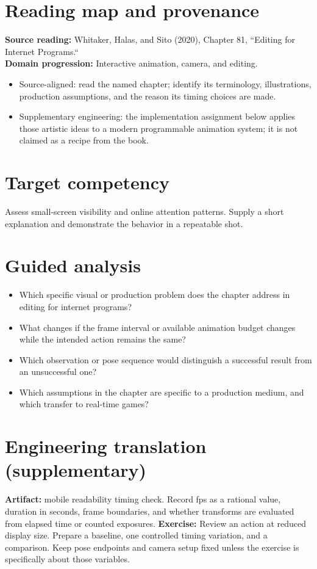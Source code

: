 \documentclass[10pt,letterpaper]{article}
\begin{document}
\makedoctitle
\makedocsummary

\section{Reading map and provenance}
\textbf{Source reading:} Whitaker, Halas, and Sito (2020), Chapter 81, ``Editing for Internet Programs.``\\
\textbf{Domain progression:} Interactive animation, camera, and editing.
\begin{itemize}
\item Source-aligned: read the named chapter; identify its terminology, illustrations, production assumptions, and the reason its timing choices are made.
\item Supplementary engineering: the implementation assignment below applies those artistic ideas to a modern programmable animation system; it is not claimed as a recipe from the book.
\end{itemize}
\section{Target competency}
Assess small-screen visibility and online attention patterns. Supply a short explanation and demonstrate the behavior in a repeatable shot.
\section{Guided analysis}
\begin{itemize}
\item Which specific visual or production problem does the chapter address in editing for internet programs?
\item What changes if the frame interval or available animation budget changes while the intended action remains the same?
\item Which observation or pose sequence would distinguish a successful result from an unsuccessful one?
\item Which assumptions in the chapter are specific to a production medium, and which transfer to real-time games?
\end{itemize}
\section{Engineering translation (supplementary)}
\textbf{Artifact:} mobile readability timing check. Record fps as a rational value, duration in seconds, frame boundaries, and whether transforms are evaluated from elapsed time or counted exposures.
\textbf{Exercise:} Review an action at reduced display size. Prepare a baseline, one controlled timing variation, and a comparison. Keep pose endpoints and camera setup fixed unless the exercise is specifically about those variables.
\end{document}
